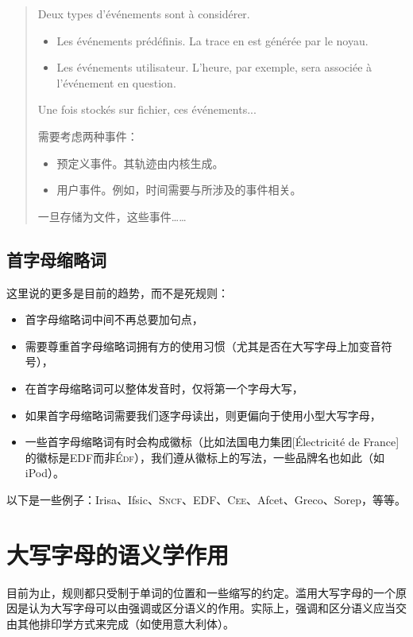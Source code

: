\begin{quote}
    Deux types d’événements sont à considérer.
    \begin{itemize}
        \item Les événements prédéfinis. La trace en est générée par le noyau.
        \item Les événements utilisateur. L’heure, par exemple, sera associée à l’événement en question.
    \end{itemize}
    Une fois stockés sur fichier, ces événements...
    \begin{bil}
        需要考虑两种事件：
        \begin{itemize}
            \item 预定义事件。其轨迹由内核生成。
            \item 用户事件。例如，时间需要与所涉及的事件相关。
        \end{itemize}
        一旦存储为文件，这些事件……
    \end{bil}
\end{quote}

\subsection{首字母缩略词}

这里说的更多是目前的趋势，而不是死规则：

\begin{itemize}
    \item 首字母缩略词中间不再总要加句点，
    \item 需要尊重首字母缩略词拥有方的使用习惯（尤其是否在大写字母上加变音符号），
    \item 在首字母缩略词可以整体发音时，仅将第一个字母大写，
    \item 如果首字母缩略词需要我们逐字母读出，则更偏向于使用小型大写字母，
    \item 一些首字母缩略词有时会构成徽标（比如法国电力集团[Électricité de France]的徽标是EDF而非\textsc{Édf}），我们遵从徽标上的写法，一些品牌名也如此（如iPod）。
\end{itemize}

以下是一些例子：Irisa、Ifsic、\textsc{Sncf}、EDF、\textsc{Cee}、Afcet、Greco、Sorep，等等。

\section{大写字母的语义学作用}

目前为止，规则都只受制于单词的位置和一些缩写的约定。滥用大写字母的一个原因是认为大写字母可以由强调或区分语义的作用。实际上，强调和区分语义应当交由其他排印学方式来完成（如使用意大利体）。

